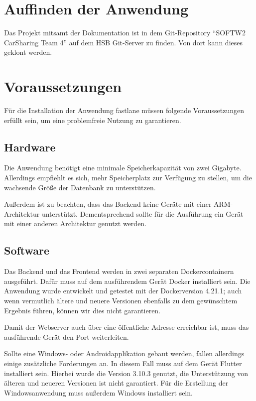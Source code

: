 \section{Auffinden der Anwendung}
\label{sec:auffinden}

Das Projekt mitsamt der Dokumentation ist in dem Git-Repository \enquote{SOFTW2 CarSharing Team 4} auf dem HSB Git-Server zu finden.
Von dort kann dieses geklont werden.

\section{Voraussetzungen}
\label{sec:voraussetzungen}

Für die Installation der Anwendung fastlane müssen folgende Voraussetzungen erfüllt sein, um eine problemfreie
Nutzung zu garantieren.

\subsection{Hardware}
\label{subsec:hardware}

Die Anwendung benötigt eine minimale Speicherkapazität von zwei Gigabyte.
Allerdings empfiehlt es sich, mehr Speicherplatz zur Verfügung zu stellen, um die wachsende Größe der Datenbank
zu unterstützen. \medskip

Außerdem ist zu beachten, dass das Backend keine Geräte mit einer ARM-Architektur unterstützt.
Dementsprechend sollte für die Ausführung ein Gerät mit einer anderen Architektur genutzt werden.

\subsection{Software}
\label{subsec:software}

Das Backend und das Frontend werden in zwei separaten Dockercontainern ausgeführt.
Dafür muss auf dem ausführendem Gerät Docker installiert sein.
Die Anwendung wurde entwickelt und getestet mit der Dockerversion 4.21.1;
auch wenn vermutlich ältere und neuere Versionen ebenfalls zu dem gewünschtem Ergebnis führen, können wir dies
nicht garantieren. \medskip

Damit der Webserver auch über eine öffentliche Adresse erreichbar ist, muss das ausführende
Gerät den Port weiterleiten. \medskip

Sollte eine Windows- oder Androidapplikation gebaut werden, fallen allerdings einige zusätzliche Forderungen an.
In diesem Fall muss auf dem Gerät Flutter installiert sein.
Hierbei wurde die Version 3.10.3 genutzt, die Unterstützung von älteren und neueren Versionen ist nicht garantiert.
Für die Erstellung der Windowsanwendung muss außerdem Windows installiert sein.

